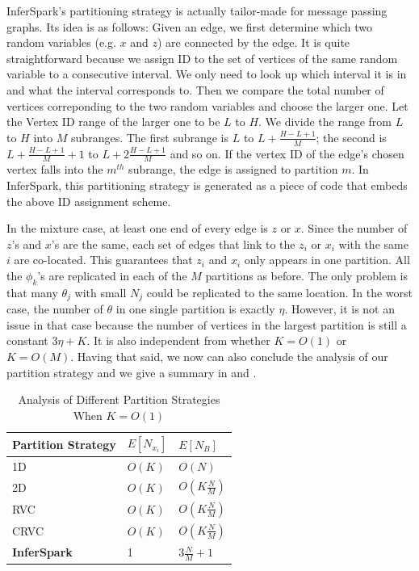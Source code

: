 InferSpark's partitioning strategy is actually tailor-made for message passing graphs.
Its idea is as follows: Given an edge, we first determine
which two random variables (e.g. $x$ and $z$) are connected by the edge. It is
quite straightforward because we assign ID to the set of vertices of the same
random variable to a consecutive interval. We only need to look up which
interval it is in and what the interval corresponds to. Then we compare the
total number of vertices correponding to the two random variables and choose
the larger one. Let the Vertex ID range of the larger one to be $L$ to $H$. We
divide the range from $L$ to $H$ into $M$ subranges. The first subrange is $L$
to $L + \frac{H-L+1}{M}$; the second is $L + \frac{H-L+1}{M} + 1$ to $L +
2\frac{H-L+1}{M}$ and so on. If the vertex ID of the edge's chosen vertex falls
into the $m^{th}$ subrange, the edge is assigned to partition $m$.
In InferSpark, this partitioning strategy is generated
as a piece of code that embeds the above ID assignment scheme.


In the mixture case, at least one end of every edge is $z$ or $x$. Since
the number of $z$'s and $x$'s are the same,
each set of edges that link to the $z_i$ or $x_i$ with
the same $i$ are co-located. This guarantees that $z_i$
and $x_i$ only appears in one partition. All the $\phi_k$'s are replicated in each
of the $M$ partitions as before. The only problem is that many $\theta_j$ with
small $N_j$ could be replicated to the same location. In the worst case, the
number of $\theta$ in one single partition is exactly $\eta$. However, it is
not an issue in that case because the number of vertices in the largest
partition is still a constant $3\eta + K$. It is also independent from whether $K
= O(1)$ or $K = O(M)$.
Having that said, we now can also conclude the analysis of our partition strategy
and we give a summary in
 and
.




\begin{table}[h]
	\centering
	\caption{Analysis of Different Partition Strategies When $K = O(1)$}
	\label{tab:max_v_per_edge_part_O1}
	\small
	\begin{tabular}{lll}
		\hline
		Partition Strategy & $E[N_{x_i}]$ & $E[N_B]$\\\hline\hline
		1D & $O(K)$ & $O(N)$ \\\hline
		2D & $O(K)$ & $O(K\frac{N}{M})$ \\\hline
		RVC & $O(K)$ & $O(K\frac{N}{M})$ \\\hline
		CRVC & $O(K)$ & $O(K\frac{N}{M})$ \\\hline
		{\bf InferSpark} & 1 & $3\frac{N}{M}+1$ \\\hline
	\end{tabular}
\end{table}


